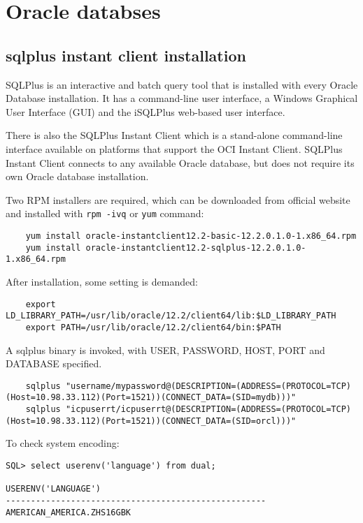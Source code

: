 \section{Oracle databses}


\subsection{sqlplus instant client installation}

SQLPlus is an interactive and batch query tool that is installed with every Oracle Database installation.
 It has a command-line user interface, a Windows Graphical User Interface (GUI) and the iSQLPlus web-based user interface.

There is also the SQLPlus Instant Client which is a stand-alone command-line interface available on platforms that support the OCI Instant Client. 
SQLPlus Instant Client connects to any available Oracle database, but does not require its own Oracle database installation.

Two RPM installers are required, which can be downloaded from official website and installed with \verb|rpm -ivq| or \verb|yum| command:
\begin{verbatim}
    yum install oracle-instantclient12.2-basic-12.2.0.1.0-1.x86_64.rpm  
    yum install oracle-instantclient12.2-sqlplus-12.2.0.1.0-1.x86_64.rpm 
\end{verbatim}

After installation, some setting is demanded:

\begin{verbatim}
    export LD_LIBRARY_PATH=/usr/lib/oracle/12.2/client64/lib:$LD_LIBRARY_PATH
    export PATH=/usr/lib/oracle/12.2/client64/bin:$PATH
\end{verbatim}

A sqlplus binary is invoked, with USER, PASSWORD, HOST, PORT and DATABASE specified.
\begin{verbatim}
    sqlplus "username/mypassword@(DESCRIPTION=(ADDRESS=(PROTOCOL=TCP)(Host=10.98.33.112)(Port=1521))(CONNECT_DATA=(SID=mydb)))"
    sqlplus "icpuserrt/icpuserrt@(DESCRIPTION=(ADDRESS=(PROTOCOL=TCP)(Host=10.98.33.112)(Port=1521))(CONNECT_DATA=(SID=orcl)))"
\end{verbatim}



To check system encoding:
\begin{verbatim}
SQL> select userenv('language') from dual;

USERENV('LANGUAGE')
----------------------------------------------------
AMERICAN_AMERICA.ZHS16GBK
\end{verbatim}

